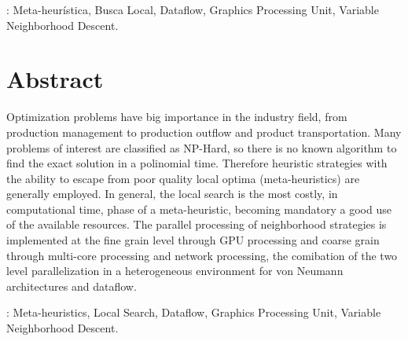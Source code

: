 \vspace{1em}
: Meta-heurística, Busca Local, Dataflow, Graphics Processing Unit, Variable Neighborhood Descent.


\chapter*{Abstract}

Optimization problems have big importance in the industry field, from production management to production outflow and product transportation.
Many problems of interest are classified as NP-Hard, so there is no known algorithm to find the exact solution in a polinomial time.
Therefore heuristic strategies with the ability to escape from poor quality local optima (meta-heuristics) are generally employed.
In general, the local search is the most costly, in computational time, phase of a meta-heuristic, becoming mandatory a good use of the available resources.
The parallel processing of neighborhood strategies is implemented at the fine grain level through GPU processing and coarse grain through multi-core processing and network processing, the comibation of the two level parallelization in a heterogeneous environment for von Neumann architectures and dataflow.

\vspace{1em}
: Meta-heuristics, Local Search, Dataflow, Graphics Processing Unit, Variable Neighborhood Descent.